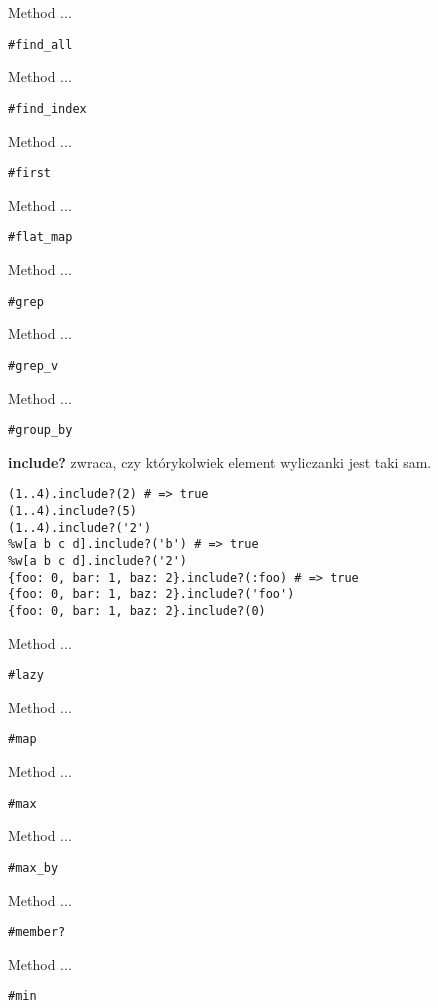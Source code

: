 Method ...
\begin{verbatim}
#find_all
\end{verbatim}

Method ...
\begin{verbatim}
#find_index
\end{verbatim}

Method ...
\begin{verbatim}
#first
\end{verbatim}

Method ...
\begin{verbatim}
#flat_map
\end{verbatim}

Method ...
\begin{verbatim}
#grep
\end{verbatim}

Method ...
\begin{verbatim}
#grep_v
\end{verbatim}

Method ...
\begin{verbatim}
#group_by
\end{verbatim}

\textbf{include?} zwraca, czy którykolwiek element wyliczanki jest taki sam.
\begin{verbatim}
(1..4).include?(2) # => true
(1..4).include?(5)
(1..4).include?('2')
%w[a b c d].include?('b') # => true
%w[a b c d].include?('2')
{foo: 0, bar: 1, baz: 2}.include?(:foo) # => true
{foo: 0, bar: 1, baz: 2}.include?('foo')
{foo: 0, bar: 1, baz: 2}.include?(0)
\end{verbatim}


Method ...
\begin{verbatim}
#lazy
\end{verbatim}

Method ...
\begin{verbatim}
#map
\end{verbatim}

Method ...
\begin{verbatim}
#max
\end{verbatim}

Method ...
\begin{verbatim}
#max_by
\end{verbatim}

Method ...
\begin{verbatim}
#member?
\end{verbatim}

Method ...
\begin{verbatim}
#min
\end{verbatim}


